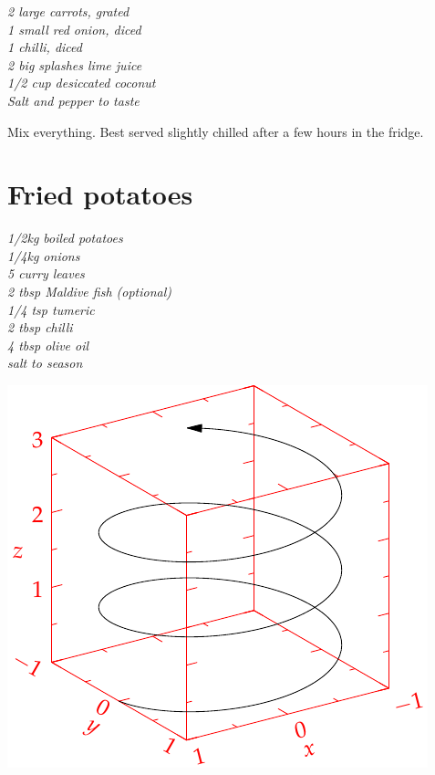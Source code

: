 \documentclass{tufte-book}
\begin{document}
\smallskip
\emph{2 large carrots, grated
\\1 small red onion, diced
\\1 chilli, diced
\\2 big splashes lime juice
\\1/2 cup desiccated coconut
\\Salt and pepper to taste}

\smallskip
Mix everything. Best served slightly chilled after a few hours in the fridge.



\section{Fried potatoes}
\emph{1/2kg boiled potatoes
\\1/4kg onions
\\5 curry leaves
\\2 tbsp Maldive fish (optional)
\\1/4 tsp tumeric
\\2 tbsp chilli
\\4 tbsp olive oil
\\salt to season
}

\begin{marginfigure}%
  \includegraphics[width=\linewidth]{helix}
\end{marginfigure}
\end{document}

